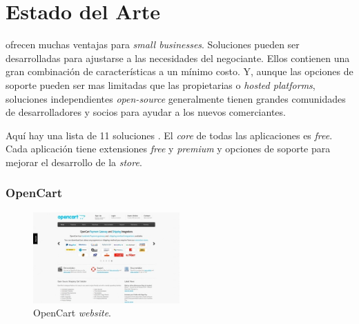 \chapter{Estado del Arte}\label{cap:estadoArte}

%
%



\opensource \ecommerce \shoppingcarts ofrecen muchas ventajas para \textit{small businesses}. Soluciones \opensource pueden ser desarrolladas para ajustarse a las necesidades del negociante. Ellos contienen una gran combinación de características a un mínimo costo. Y, aunque las opciones de soporte pueden ser mas limitadas que las propietarias o \textit{hosted platforms}, soluciones independientes \textit{open-source} generalmente tienen grandes comunidades de desarrolladores y socios para ayudar a los nuevos comerciantes.

Aquí hay una lista de 11 soluciones \ecommerce \opensource. El \textit{core} de todas las aplicaciones es \textit{free}. Cada aplicación tiene extensiones \textit{free} y \textit{premium} y opciones de soporte para mejorar el desarrollo de la \textit{store}.

\newcommand{\nameOpenCart}{OpenCart }
\subsection{\nameOpenCart}

\begin{figure}[h!]
	\centering
	\includegraphics[width=0.5\textwidth]{figuras/cap1/openCartWebsite.jpg}
	\caption{\nameOpenCart \textit{website}\cite{online_OpenCartWebsite}.}
\end{figure}

